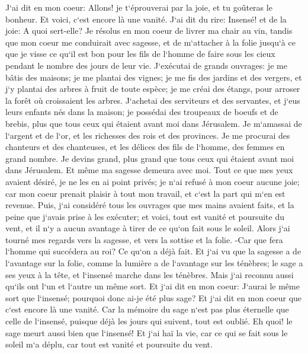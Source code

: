 \verse J`ai dit en mon coeur: Allons! je t`éprouverai par la joie, et tu goûteras le bonheur. Et voici, c`est encore là une vanité. 
\verse J`ai dit du rire: Insensé! et de la joie: A quoi sert-elle? 
\verse Je résolus en mon coeur de livrer ma chair au vin, tandis que mon coeur me conduirait avec sagesse, et de m`attacher à la folie jusqu`à ce que je visse ce qu`il est bon pour les fils de l`homme de faire sous les cieux pendant le nombre des jours de leur vie. 
\verse J`exécutai de grands ouvrages: je me bâtis des maisons; je me plantai des vignes; 
\verse je me fis des jardins et des vergers, et j`y plantai des arbres à fruit de toute espèce; 
\verse je me créai des étangs, pour arroser la forêt où croissaient les arbres. 
\verse J`achetai des serviteurs et des servantes, et j`eus leurs enfants nés dans la maison; je possédai des troupeaux de boeufs et de brebis, plus que tous ceux qui étaient avant moi dans Jérusalem. 
\verse Je m`amassai de l`argent et de l`or, et les richesses des rois et des provinces. Je me procurai des chanteurs et des chanteuses, et les délices des fils de l`homme, des femmes en grand nombre. 
\verse Je devins grand, plus grand que tous ceux qui étaient avant moi dans Jérusalem. Et même ma sagesse demeura avec moi. 
\verse Tout ce que mes yeux avaient désiré, je ne les en ai point privés; je n`ai refusé à mon coeur aucune joie; car mon coeur prenait plaisir à tout mon travail, et c`est la part qui m`en est revenue. 
\verse Puis, j`ai considéré tous les ouvrages que mes mains avaient faits, et la peine que j`avais prise à les exécuter; et voici, tout est vanité et poursuite du vent, et il n`y a aucun avantage à tirer de ce qu`on fait sous le soleil. 
\verse Alors j`ai tourné mes regards vers la sagesse, et vers la sottise et la folie. -Car que fera l`homme qui succédera au roi? Ce qu`on a déjà fait. 
\verse Et j`ai vu que la sagesse a de l`avantage sur la folie, comme la lumière a de l`avantage sur les ténèbres; 
\verse le sage a ses yeux à la tête, et l`insensé marche dans les ténèbres. Mais j`ai reconnu aussi qu`ils ont l`un et l`autre un même sort. 
\verse Et j`ai dit en mon coeur: J`aurai le même sort que l`insensé; pourquoi donc ai-je été plus sage? Et j`ai dit en mon coeur que c`est encore là une vanité. 
\verse Car la mémoire du sage n`est pas plus éternelle que celle de l`insensé, puisque déjà les jours qui suivent, tout est oublié. Eh quoi! le sage meurt aussi bien que l`insensé! 
\verse Et j`ai haï la vie, car ce qui se fait sous le soleil m`a déplu, car tout est vanité et poursuite du vent. 
